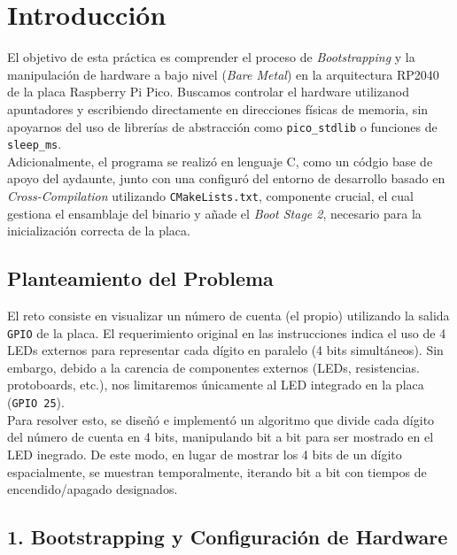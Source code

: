 \documentclass[12pt,letterpaper]{article}
\begin{document}


\newpage

\section*{Introducción}
El objetivo de esta práctica es comprender el proceso de \textit{Bootstrapping} y la manipulación de hardware a bajo nivel (\textit{Bare Metal}) en la arquitectura RP2040  de la placa Raspberry Pi Pico. Buscamos controlar el hardware utilizanod apuntadores y escribiendo directamente en direcciones físicas de memoria, sin apoyarnos del uso de librerías de abstracción como \texttt{pico\_stdlib} o funciones de \texttt{sleep\_ms}.\\

\noindent
Adicionalmente, el programa se realizó en lenguaje C, como un códgio base de apoyo del aydaunte, junto con una configuró del entorno de desarrollo basado en \textit{Cross-Compilation} utilizando \texttt{CMakeLists.txt}, componente crucial, el cual gestiona el ensamblaje del binario y añade el \textit{Boot Stage 2}, necesario para la inicialización correcta de la placa.

\subsection*{Planteamiento del Problema}

El reto consiste en visualizar un número de cuenta (el propio) utilizando la salida \texttt{GPIO} de la placa. El requerimiento original en las instrucciones indica el uso de 4 LEDs externos para representar cada dígito en paralelo (4 bits simultáneos). Sin embargo, debido a la carencia de componentes externos (LEDs, resistencias. protoboards, etc.), nos limitaremos únicamente al LED integrado en la placa (\texttt{GPIO 25}).\\

\noindent
Para resolver esto, se diseñó e implementó un algoritmo que divide cada dígito del número de cuenta en 4 bits, manipulando bit a bit para ser mostrado en el LED inegrado. De este modo, en lugar de mostrar los 4 bits de un dígito espacialmente, se muestran temporalmente, iterando bit a bit con tiempos de encendido/apagado designados.

\newpage

\subsection*{1. Bootstrapping y Configuración de Hardware}
\end{document}
